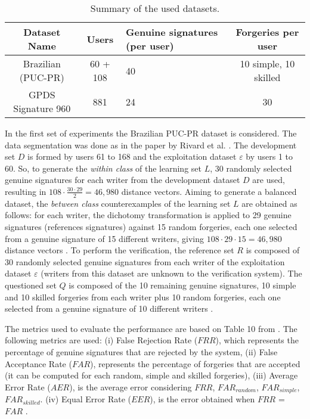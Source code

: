 \documentclass[conference]{IEEEtran}
\begin{document}
\begin{table}[!htb]
\caption{Summary of the used datasets.}
\label{tab:summary}
\scriptsize
\centering

\begin{tabular}{ccC{1cm}c}
\hline
Dataset Name & Users & Genuine signatures (per user) & Forgeries per user \\ 
\hline
Brazilian (PUC-PR) & 60 + 108 & 40  &  10 simple, 10
skilled \\ 
GPDS Signature 960 & 881 & 24  &  30 \\ 

\hline

\end{tabular}
\end{table}

In the first set of experiments the Brazilian PUC-PR dataset is considered. The data segmentation was done as in the paper by Rivard et al. \cite{rivard:13}. The development set $D$ is formed by users 61 to 168 and the exploitation dataset $\varepsilon$ by users 1 to 60.
So, to generate the \textit{within class} of the learning set $L$, 30 randomly selected genuine signatures for each writer from the development dataset $D$ are used, resulting in $108 \cdot \frac{30 \cdot 29}{2} = 46,980$ distance vectors. Aiming to generate a balanced dataset, the \textit{between class} counterexamples of the learning set $L$ are obtained as follows: for each writer, the dichotomy transformation is applied to 29 genuine signatures (references signatures) against 15 random forgeries, each one selected from a genuine signature of 15 different writers, giving $ 108 \cdot 29 \cdot 15 = 46,980$ distance vectors \cite{rivard:13}. 
To perform the verification, the reference set $R$ is composed of 30 randomly selected genuine signatures from each writer of the exploitation dataset $\varepsilon$ (writers from this dataset are unknown to the verification system). The questioned set $Q$ is composed of the 10 remaining genuine signatures, 10 simple and 10 skilled forgeries from each writer plus 10 random forgeries, each one selected from a genuine signature of 10 different writers \cite{rivard:13}.

The metrics used to evaluate the performance are based on Table 10 from \cite{hafemann:17}. 
The following metrics are used: (i) False Rejection Rate ($FRR$), which represents the percentage of genuine signatures that are rejected by the system, (ii) False Acceptance Rate ($FAR$), represents the percentage of forgeries that are accepted (it can be computed for each random, simple and skilled forgeries), (iii) Average Error Rate ($AER$), is the average error considering $FRR$, $FAR_{random}$, $FAR_{simple}$, $FAR_{skilled}$.  (iv) Equal Error Rate ($EER$), is the error obtained when $FRR$ = $FAR$ \cite{hafemann_review:17}.
\end{document}
